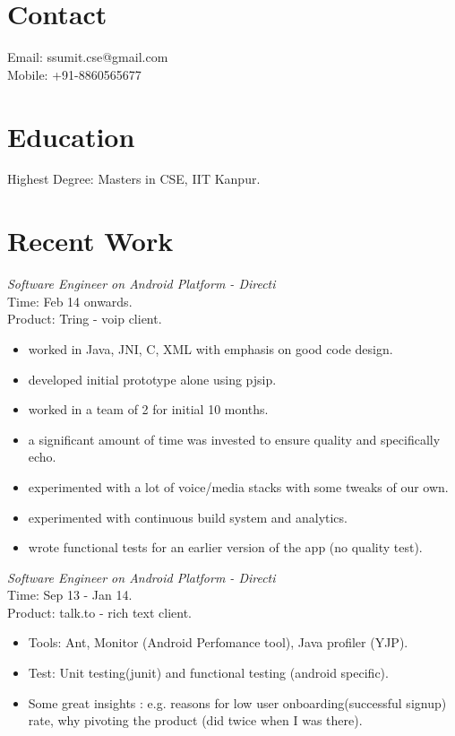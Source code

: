 \documentclass[margin,line]{resume}
\begin{document}
\begin{resume}

    \section{\mysidestyle Contact}
    	Email: ssumit.cse@gmail.com\\
    	Mobile: +91-8860565677
    \section{\mysidestyle Education}
	Highest Degree: Masters in CSE, IIT Kanpur.

    \section{\mysidestyle Recent Work}

\textit{Software Engineer on Android Platform - Directi} \\
Time: Feb 14 onwards.\\
Product: Tring - voip client.\\
\begin{itemize}
	\item worked in Java, JNI, C, XML with emphasis on good code design.
        \item developed initial prototype alone using pjsip.
        \item worked in a team of 2 for initial 10 months.
	\item a significant amount of time was invested to ensure quality and specifically echo.
	\item experimented with a lot of voice/media stacks with some tweaks of our own.
	\item experimented with continuous build system and analytics.
	\item wrote functional tests for an earlier version of the app (no quality test). 
 \end{itemize}

\textit{Software Engineer on Android Platform - Directi} \\
Time: Sep 13 - Jan 14.\\
Product: talk.to - rich text client.\\
\begin{itemize}
\item Tools: Ant, Monitor (Android Perfomance tool), Java profiler (YJP).
\item Test: Unit testing(junit) and functional testing (android specific).
\item Some great insights : e.g. reasons for low user onboarding(successful signup) rate, why pivoting the product (did twice when I was there).
\end{itemize}


\end{resume}
\end{document}
